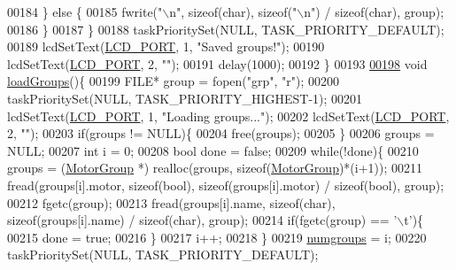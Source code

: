 \begin{DoxyCode}
00184         \} \textcolor{keywordflow}{else} \{
00185             fwrite(\textcolor{stringliteral}{"\(\backslash\)n"}, \textcolor{keyword}{sizeof}(\textcolor{keywordtype}{char}), \textcolor{keyword}{sizeof}(\textcolor{stringliteral}{"\(\backslash\)n"}) / \textcolor{keyword}{sizeof}(\textcolor{keywordtype}{char}), group);
00186         \}
00187     \}
00188     taskPrioritySet(NULL, TASK\_PRIORITY\_DEFAULT);
00189     lcdSetText(\hyperlink{lcdmsg_8h_abcf42bd88b3c36193f301ca25b033875}{LCD\_PORT}, 1, \textcolor{stringliteral}{"Saved groups!"});
00190     lcdSetText(\hyperlink{lcdmsg_8h_abcf42bd88b3c36193f301ca25b033875}{LCD\_PORT}, 2, \textcolor{stringliteral}{""});
00191     delay(1000);
00192 \}
00193 
\hypertarget{lcddiag_8c_source.tex_l00198}{}\hyperlink{lcddiag_8c_a98f03692fe38505e9b0231122b976c0e}{00198} \textcolor{keywordtype}{void} \hyperlink{lcddiag_8c_a98f03692fe38505e9b0231122b976c0e}{loadGroups}()\{
00199     FILE* group = fopen(\textcolor{stringliteral}{"grp"}, \textcolor{stringliteral}{"r"});
00200     taskPrioritySet(NULL, TASK\_PRIORITY\_HIGHEST-1);
00201     lcdSetText(\hyperlink{lcdmsg_8h_abcf42bd88b3c36193f301ca25b033875}{LCD\_PORT}, 1, \textcolor{stringliteral}{"Loading groups..."});
00202     lcdSetText(\hyperlink{lcdmsg_8h_abcf42bd88b3c36193f301ca25b033875}{LCD\_PORT}, 2, \textcolor{stringliteral}{""});
00203     \textcolor{keywordflow}{if}(groups != NULL)\{
00204         free(groups);
00205     \}
00206     groups = NULL;
00207     \textcolor{keywordtype}{int} i = 0;
00208     \textcolor{keywordtype}{bool} done = \textcolor{keyword}{false};
00209     \textcolor{keywordflow}{while}(!done)\{
00210         groups = (\hyperlink{struct_motor_group}{MotorGroup} *) realloc(groups, \textcolor{keyword}{sizeof}(\hyperlink{struct_motor_group}{MotorGroup})*(i+1));
00211         fread(groups[i].motor, \textcolor{keyword}{sizeof}(\textcolor{keywordtype}{bool}), \textcolor{keyword}{sizeof}(groups[i].motor) / \textcolor{keyword}{sizeof}(\textcolor{keywordtype}{bool}), group);
00212         fgetc(group);
00213         fread(groups[i].name, \textcolor{keyword}{sizeof}(\textcolor{keywordtype}{char}), \textcolor{keyword}{sizeof}(groups[i].name) / \textcolor{keyword}{sizeof}(\textcolor{keywordtype}{char}), group);
00214         \textcolor{keywordflow}{if}(fgetc(group) == \textcolor{charliteral}{'\(\backslash\)t'})\{
00215             done = \textcolor{keyword}{true};
00216         \}
00217         i++;
00218     \}
00219     \hyperlink{lcddiag_8c_a205f1cedec1664555276e0a71a1c87d8}{numgroups} = i;
00220     taskPrioritySet(NULL, TASK\_PRIORITY\_DEFAULT);

\end{DoxyCode}
